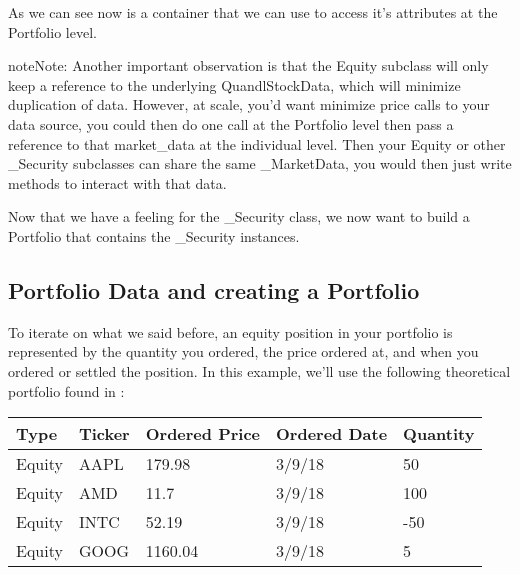 \documentclass[letterpaper,10pt,english]{sphinxmanual}
\begin{document}
As we can see  now is a container that we can use to
access it’s attributes at the Portfolio level.

\begin{sphinxadmonition}{note}{Note:}
Another important observation is that the Equity subclass will
only keep a reference to the underlying QuandlStockData, which will
minimize duplication of data. However, at scale, you’d want minimize
price calls to your data source, you could then do one call at the
Portfolio level then pass a reference to that market\_data at the
individual level. Then your Equity or other \_Security subclasses
can share the same \_MarketData, you would then just write methods
to interact with that data.
\end{sphinxadmonition}

Now that we have a feeling for the \_Security class, we now want to
build a Portfolio that contains the \_Security instances.


\subsection{Portfolio Data and creating a Portfolio}
\label{\detokenize{gettingstarted:portfolio-data-and-creating-a-portfolio}}
To iterate on what we said before, an equity position in your portfolio
is represented by the quantity you ordered, the price ordered at, and
when you ordered or settled the position. In this example, we’ll use the
following theoretical portfolio found in :


\begin{savenotes}\sphinxattablestart
\centering
\begin{tabulary}{\linewidth}[t]{|T|T|T|T|T|}
\hline
\sphinxstyletheadfamily 
Type
&\sphinxstyletheadfamily 
Ticker
&\sphinxstyletheadfamily 
Ordered Price
&\sphinxstyletheadfamily 
Ordered Date
&\sphinxstyletheadfamily 
Quantity
\\
\hline
Equity
&
AAPL
&
179.98
&
3/9/18
&
50
\\
\hline
Equity
&
AMD
&
11.7
&
3/9/18
&
100
\\
\hline
Equity
&
INTC
&
52.19
&
3/9/18
&
-50
\\
\hline
Equity
&
GOOG
&
1160.04
&
3/9/18
&
5
\\
\hline
\end{tabulary}
\par
\sphinxattableend\end{savenotes}
\end{document}
